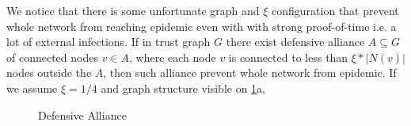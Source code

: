 \documentclass[nostrict]{szablonPG}
\begin{document}
We notice that there is some unfortunate graph and $\xi$ configuration that prevent whole network from reaching epidemic even with with strong proof-of-time i.e. a lot of external infections.
If in trust graph $G$ there exist defensive alliance $A \subseteq G$ of connected nodes $v \in A$, where each node $v$ is connected to less than $\xi * |N(v)|$ nodes outside the $A$, then such alliance prevent whole network from epidemic. If we assume $\xi = 1/4$ and graph structure visible on \ref{fig:defensive-alliance}a,
\begin{figure}[h!]
 \hfill 	
\caption{Defensive Alliance}
\label{fig:defensive-alliance}
\end{figure}
\end{document}
